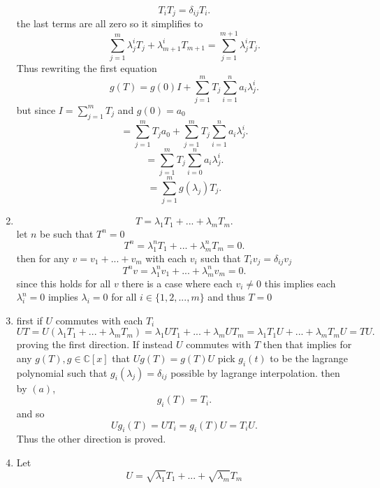 \documentclass{article}
\begin{document}
\begin{enumerate}[label = (\alph*)]
                \[
                    T_{i}T_{j} = \delta_{ij}T_i
                .\] 
                the last terms are all zero so it simplifies to
                \[
                    \sum_{j=1}^{m}\lambda_j^{i}T_j + \lambda_{m+1}^{i}T_{m+1} = \sum_{j=1}^{m+1}\lambda_j^{i}T_j
                .\] 
                Thus rewriting the first equation
                \[
                g(T) = g(0)I + \sum_{j=1}^{m}T_j\sum_{i=1}^{n}a_i\lambda_j^{i}
                .\] 
                but since $I = \sum_{j=1}^{m}T_j$ and $g(0) = a_0$
                \[
                = \sum_{j=1}^{m}T_ja_0 + \sum_{j=1}^{m}T_j\sum_{i=1}^{n}a_i\lambda_j^{i}
                .\] 
                \[
                = \sum_{j=1}^{m}T_j\sum_{i=0}^{n}a_i\lambda_j^{i}
                .\] 
                \[
                = \sum_{j=1}^{m}g(\lambda_j)T_j
                .\] 
            \item 
                \[
                T = \lambda_1T_1 + ... + \lambda_mT_m
                .\] 
                let $n$ be such that $T^{n} = 0$
                \[
                T^{n} = \lambda_1^{n}T_1 + ... + \lambda_m^{n}T_m = 0
                .\] 
                then for any $v = v_1 + ... + v_m$ with each $v_i$ such that $T_iv_j = \delta_{ij}v_j$
                \[
                T^{n}v = \lambda_1^{n}v_1 + ...  + \lambda_m^{n}v_m = 0
                .\] 
                since this holds for all $v$ there is a case where each $v_i \ne 0$ this implies each $\lambda_i^{n} = 0$ implies $\lambda_i = 0$ for all $i \in \{1,2,...,m\}$
                and thus  $T = 0$
            \item 
                first if $U$ commutes with each $T_i$
                \[
                    UT = U(\lambda_1T_1 + ... + \lambda_mT_m) = \lambda_1UT_1 + ... + \lambda_mUT_m = \lambda_1T_1U + ... + \lambda_mT_mU = TU
                .\] 
                proving the first direction. If instead $U$ commutes with $T$ then that implies
                for any $g(T), g \in \mathbb{C}[x]$ that $Ug(T) = g(T)U$ pick  $g_i(t)$ to be the lagrange polynomial
                such that $g_i(\lambda_j) = \delta_{ij}$ possible by lagrange interpolation. then by $(a)$,
                 \[
                g_i(T) = T_i
                .\] 
                and so
                \[
                Ug_i(T) = UT_i = g_i(T)U = T_iU
                .\] 
                Thus the other direction is proved.
            \item Let 
                \[
                U = \sqrt{\lambda_1}T_1 + ... + \sqrt{\lambda_m}T_m
\]
\end{enumerate}
\end{document}
